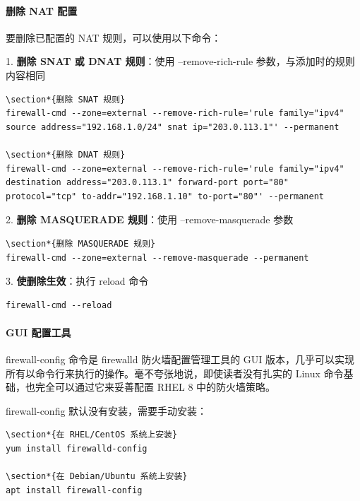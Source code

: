 \documentclass[12pt,UTF8]{ctexbook}
\begin{document}
\paragraph{删除 NAT 配置}
要删除已配置的 NAT 规则，可以使用以下命令：

1. \textbf{删除 SNAT 或 DNAT 规则}：使用 --remove-rich-rule 参数，与添加时的规则内容相同
\begin{verbatim}
\section*{删除 SNAT 规则}
firewall-cmd --zone=external --remove-rich-rule='rule family="ipv4" source address="192.168.1.0/24" snat ip="203.0.113.1"' --permanent

\section*{删除 DNAT 规则}
firewall-cmd --zone=external --remove-rich-rule='rule family="ipv4" destination address="203.0.113.1" forward-port port="80" protocol="tcp" to-addr="192.168.1.10" to-port="80"' --permanent
\end{verbatim}

2. \textbf{删除 MASQUERADE 规则}：使用 --remove-masquerade 参数
\begin{verbatim}
\section*{删除 MASQUERADE 规则}
firewall-cmd --zone=external --remove-masquerade --permanent
\end{verbatim}

3. \textbf{使删除生效}：执行 reload 命令
\begin{verbatim}
firewall-cmd --reload
\end{verbatim}

\paragraph{GUI 配置工具}
firewall-config 命令是 firewalld 防火墙配置管理工具的 GUI 版本，几乎可以实现所有以命令行来执行的操作。毫不夸张地说，即使读者没有扎实的 Linux 命令基础，也完全可以通过它来妥善配置 RHEL 8 中的防火墙策略。

firewall-config 默认没有安装，需要手动安装：
\begin{verbatim}
\section*{在 RHEL/CentOS 系统上安装}
yum install firewalld-config

\section*{在 Debian/Ubuntu 系统上安装}
apt install firewall-config
\end{verbatim}
\end{document}
